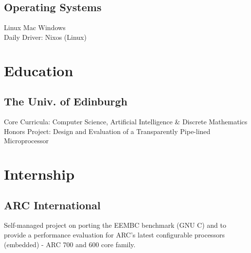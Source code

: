 \documentclass[]{cv}
\begin{document}
\begin{minipage}[t]{0.25\textwidth}
\subsection{Operating Systems}\label{subsec:operating-systems}
\sectionsep
Linux
\textbullet{} Mac
\textbullet{} Windows \\
Daily Driver: Nixos (Linux)

\section{Education}\label{sec:education}
\subsection{The Univ. of Edinburgh}\label{subsec:the-university-of-edinburgh}
Core Curricula: Computer Science, Artificial Intelligence \& Discrete Mathematics \\
Honors Project: Design and Evaluation of a Transparently Pipe-lined Microprocessor

\section{Internship}\label{sec:internship}
\subsection{ARC International}\label{subsec:arc-international}
Self-managed project on porting the EEMBC benchmark (GNU C) and to provide a performance evaluation for ARC’s latest configurable processors (embedded) - ARC 700 and 600 core family.

\end{minipage}
\end{document}
